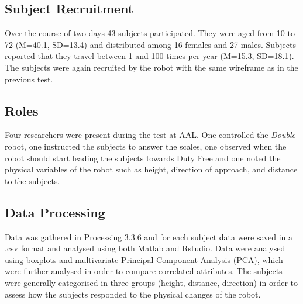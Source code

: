 \subsection{Subject Recruitment}
Over the course of two days 43 subjects participated. They were aged from 10 to 72 (M=40.1, SD=13.4) and distributed among 16 females and 27 males. Subjects reported that they travel between 1 and 100 times per year (M=15.3, SD=18.1). The subjects were again recruited by the robot with the same wireframe as in the previous test.

\subsection{Roles}
Four researchers were present during the test at AAL. One controlled the \textit{Double} robot, one instructed the subjects to answer the scales, one observed when the robot should start leading the subjects towards Duty Free and one noted the physical variables of the robot such as height, direction of approach, and distance to the subjects.

\subsection{Data Processing}
Data was gathered in Processing 3.3.6 and for each subject data were saved in a .csv format and analysed using both Matlab and Rstudio. Data were analysed using boxplots and multivariate Principal Component Analysis (PCA), which were further analysed in order to compare correlated attributes. The subjects were generally categorised in three groups (height, distance, direction) in order to assess how the subjects responded to the physical changes of the robot.
